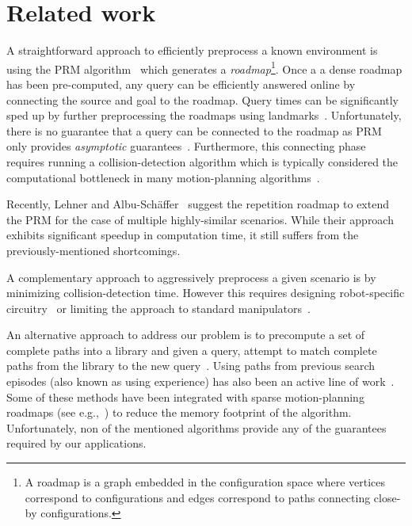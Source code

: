 \documentclass[letterpaper]{article} %
\begin{document}

\section{Related work}
\label{sec:rel}
A straightforward approach to efficiently preprocess a known environment is using the \textsf{PRM} algorithm~\cite{kavraki1996probabilistic} which generates a \emph{roadmap}\footnote{A roadmap is a graph embedded in the configuration space where vertices correspond to configurations and edges correspond to paths connecting close-by configurations.}.
Once a a dense roadmap has been pre-computed, any query can be efficiently answered online by connecting the source and goal to the roadmap. 
Query times can be significantly sped up by further preprocessing the roadmaps using landmarks~\cite{paden2017landmark}.
Unfortunately, there is no guarantee that a query can be connected to the roadmap as \textsf{PRM} only provides \emph{asymptotic} guarantees~\cite{KKL98}.
Furthermore, this connecting phase requires running a collision-detection algorithm which is typically considered the computational bottleneck in many motion-planning algorithms~\cite{L06}.

Recently, Lehner and  Albu{-}Sch{\"{a}}ffer~\cite{LA18} suggest the repetition roadmap to extend the \textsf{PRM} for the case of multiple highly-similar scenarios.
While their approach exhibits significant speedup in computation time, it still suffers from the previously-mentioned shortcomings.

A complementary approach to aggressively preprocess a given scenario is by minimizing collision-detection time.
However this requires designing robot-specific
circuitry~\cite{MFQSK16}
or limiting the approach to standard manipulators~\cite{YMILV18}.

An alternative approach to address our problem is to precompute a set of complete paths into a library and given a query, attempt to match complete paths
from the library to the new query~\cite{berenson2012robot,jetchev2013fast}.
Using paths from previous search episodes (also known as using experience) has also been an active line of work~\cite{PCCL12,PDCL13,BAG12,CSMOC15}.
Some of these methods have been integrated with sparse motion-planning roadmaps (see e.g.,~\cite{SSAH14,DB14}) to reduce the memory footprint of the algorithm.
Unfortunately, non of the mentioned algorithms provide any of the guarantees required by our applications.
\end{document}
